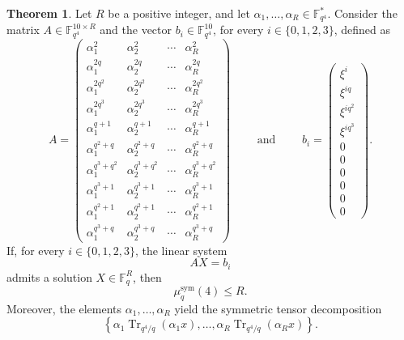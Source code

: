 \documentclass[11pt,a4paper,reqno]{article}
\numberwithin{equation}{section}
\theoremstyle{definition}
\newtheorem{theorem}{Theorem}[section]
\newcommand{\numberset}{\mathbb}
\newcommand{\F}{\numberset{F}}
\begin{document}
\begin{theorem}\label{thm:m=4}
Let \(R\) be a positive integer, and let $\alpha_1,\ldots,\alpha_R\in \mathbb F_{q^4}^*$. Consider the matrix $A\in\F_{q^4}^{10\times R}$ and the vector $b_i\in \F_{q^4}^{10}$, for every \(i\in\{0,1,2,3\}\), defined as 
\[
A=
\begin{pmatrix}
\alpha_1^2 & \alpha_2^2 & \cdots & \alpha_R^2 \\
\alpha_1^{2q} & \alpha_2^{2q} & \cdots & \alpha_R^{2q} \\
\alpha_1^{2q^2} & \alpha_2^{2q^2} & \cdots & \alpha_R^{2q^2} \\
\alpha_1^{2q^3} & \alpha_2^{2q^3} & \cdots & \alpha_R^{2q^3} \\
\alpha_1^{q+1} & \alpha_2^{q+1} & \cdots & \alpha_R^{q+1} \\
\alpha_1^{q^2+q} & \alpha_2^{q^2+q} & \cdots & \alpha_R^{q^2+q} \\
\alpha_1^{q^3+q^2} & \alpha_2^{q^3+q^2} & \cdots & \alpha_R^{q^3+q^2} \\
\alpha_1^{q^3+1} & \alpha_2^{q^3+1} & \cdots & \alpha_R^{q^3+1} \\
\alpha_1^{q^2+1} & \alpha_2^{q^2+1} & \cdots & \alpha_R^{q^2+1} \\
\alpha_1^{q^3+q} & \alpha_2^{q^3+q} & \cdots & \alpha_R^{q^3+q}
\end{pmatrix}\qquad\text{ and }\qquad
b_i=
\begin{pmatrix}
\xi^i\\
\xi^{iq}\\
\xi^{iq^2}\\
\xi^{iq^3}\\
0\\
0\\
0\\
0\\
0\\
0
\end{pmatrix}.
\]
If, for every \(i\in\{0,1,2,3\}\), the linear system
\[
AX=b_i
\]
admits a solution \(X\in\mathbb F_q^R\), then
\[
\mu_q^{\mathrm{sym}}(4)\le R.
\]
Moreover, the elements \(\alpha_1,\ldots,\alpha_R\) yield the symmetric tensor decomposition
\[
\left\{
\alpha_1\operatorname{Tr}_{q^4/q}(\alpha_1x),
\ldots,
\alpha_R\operatorname{Tr}_{q^4/q}(\alpha_Rx)
\right\}.
\]
\end{theorem}
\end{document}
